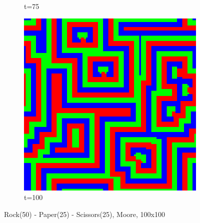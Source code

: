 \documentclass[a4paper, 11pt]{article}
\begin{document}
\begin{landscape}
\begin{figure}[H]
\begin{subfigure}{.20\textwidth}
  \caption{t=75}
\end{subfigure}%
\begin{subfigure}{.20\textwidth}
  \centering
  \includegraphics[width=0.95\linewidth]{ROCK_PAPER_SCISSORS_MOORE_100x100_HighRockPop50_t100}
  \caption{t=100}
\end{subfigure}
\caption{Rock(50) - Paper(25) - Scissors(25), Moore, 100x100}
\end{figure}


\end{landscape}
\end{document}
